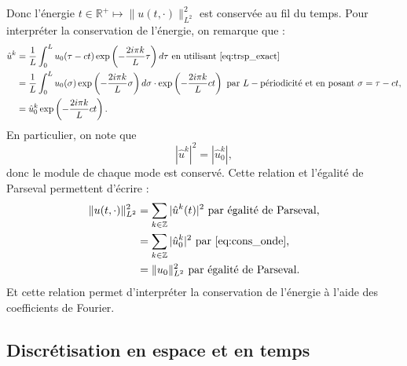 Donc l'énergie $t \in \mathbb{R}^+ \mapsto  \| u (t,\cdot) \|_{L^2}^2$ est conservée au fil du temps. Pour interpréter la conservation de l'énergie, on remarque que :
\begin{align*}
\hat{u}^k & = \dfrac{1}{L} \displaystyle\int_0^L u_0(\tau - ct) \exp \left( - \dfrac{2 i \pi k}{L} \tau \right) d \tau \text{ en utilisant \eqref{eq:trsp_exact}}\\
	& = \dfrac{1}{L} \displaystyle\int_{0}^{L} u_0(\sigma) \exp \left( - \dfrac{2 i \pi k}{L} \sigma  \right)d \sigma \cdot \exp \left( - \dfrac{2i\pi k}{L} ct \right)  \text{ par } L-\text{périodicité et en posant } \sigma = \tau - ct,\\
	& = \hat{u}_0^k \exp \left( - \dfrac{2i\pi k}{L} ct \right).
\end{align*}
En particulier, on note que 
\begin{equation}
|\hat{u}^k|^2 = |\hat{u}_0^k|,
\label{eq:cons_onde}
\end{equation}
donc le module de chaque mode est conservé. Cette relation et l'égalité de Parseval permettent d'écrire :
\begin{align*}
\| u(t,\cdot) \|^2_{L^2}  & = \displaystyle\sum\limits_{k \in \mathbb{Z}} |\hat{u}^k(t)|^2 \text{ par égalité de Parseval,}\\ 
	& = \displaystyle\sum\limits_{k \in \mathbb{Z}} |\hat{u}_0^k|^2 \text{ par \eqref{eq:cons_onde},}\\
	& = \| u_0 \|^2_{L^2} \text{ par égalité de Parseval}.
\end{align*}
Et cette relation permet d'interpréter la conservation de l'énergie à l'aide des coefficients de Fourier.























\subsection{Discrétisation en espace et en temps}

